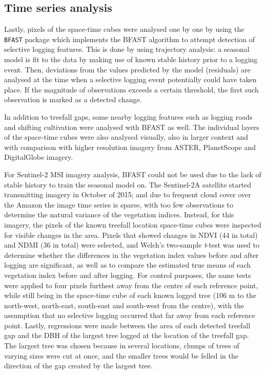 \documentclass[a4paper,12pt]{scrbook}
\begin{document}
\subsection{Time series analysis}

Lastly, pixels of the space-time cubes were analysed one by one by using the \texttt{BFAST} package which implements the \ac{BFAST} algorithm \citep{verbesselt_detecting_2010} to attempt detection of selective logging features. This is done by using trajectory analysis: a seasonal model is fit to the data by making use of known stable history prior to a logging event. Then, deviations from the values predicted by the model (residuals) are analysed at the time when a selective logging event potentially could have taken place. If the magnitude of observations exceeds a certain threshold, the first such observation is marked as a detected change.

In addition to treefall gaps, some nearby logging features such as logging roads and shifting cultivation were analysed with \ac{BFAST} as well. The individual layers of the space-time cubes were also analysed visually, also in larger context and with comparison with higher resolution imagery from \ac{ASTER}, PlanetScope and DigitalGlobe imagery.

For Sentinel-2 \ac{MSI} imagery analysis, \ac{BFAST} could not be used due to the lack of stable history to train the seasonal model on. The Sentinel-2A satellite started transmitting imagery in October of 2015; and due to frequent cloud cover over the Amazon the image time series is sparse, with too few observations to determine the natural variance of the vegetation indices. Instead, for this imagery, the pixels of the known treefall location space-time cubes were inspected for visible changes in the area. Pixels that showed changes in NDVI (44 in total) and NDMI (36 in total) were selected, and Welch's two-sample \textit{t}-test was used to determine whether the differences in the vegetation index values before and after logging are significant, as well as to compare the estimated true means of each vegetation index before and after logging. For control purposes, the same tests were applied to four pixels furthest away from the centre of each reference point, while still being in the space-time cube of each known logged tree (106 m to the north-west, north-east, south-east and south-west from the centre), with the assumption that no selective logging occurred that far away from each reference point. Lastly, regressions were made between the area of each detected treefall gap and the \ac{DBH} of the largest tree logged at the location of the treefall gap. The largest tree was chosen because in several locations, clumps of trees of varying sizes were cut at once, and the smaller trees would be felled in the direction of the gap created by the largest tree.
\end{document}
